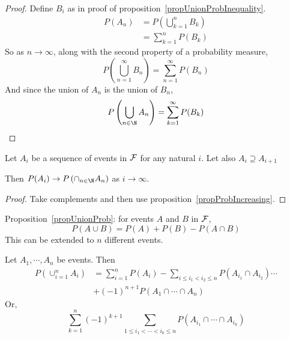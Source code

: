 \documentclass[../Main.tex]{subfiles}
\begin{document}
\begin{proof}
    Define $B_i$ as in proof of proposition~\ref{propUnionProbInequality}.
    \begin{align*}
        P(A_n) &= P\left(\bigcup_{k=1}^n B_k\right) \\
        &= \sum_{k=1}^{n} P(B_k)
    \end{align*}
    So as $n \to \infty$, along with the second property of a probability measure,
    \begin{equation*}
        P\left(\bigcup_{n=1}^\infty B_n \right) = \sum_{n=1}^{\infty} P(B_n)
    \end{equation*}
    And since the union of $A_n$ is the union of $B_n$,
    \begin{equation*}
        P\left(\bigcup_{n \in \N} A_n \right) = \sum_{k=1}^{\infty} P(B_k)
    \end{equation*}
\end{proof}
\begin{proposition}
    Let $A_i$ be a sequence of events in $\mathcal{F}$ for any natural $i$. Let also $A_i \supseteq A_{i+1}$\par
    Then $P(A_i) \to P\left(\cap_{n \in \N} A_n\right)$ as $i \to \infty$.
    \label{propProbDecreasing}
\end{proposition}
\begin{proof}
    Take complements and then use proposition~\ref{propProbIncreasing}.
\end{proof}
Proposition~\ref{propUnionProb}: for events $A$ and $B$ in $\mathcal{F}$,
\begin{equation*}
    P(A \cup B) = P(A) + P(B) - P(A \cap B)
\end{equation*}
This can be extended to $n$ different events.
\begin{theorem}
    Let $A_1, \cdots, A_n$ be events. Then
    \begin{align*}
        P\left(\cup_{i = 1}^n A_i\right) &= \sum_{i = 1}^n P(A_i) - \sum_{i \leq i_1 < i_2 \leq n} P(A_{i_1} \cap A_{i_2}) \cdots \\
        &+ (-1)^{n+1} P(A_1 \cap \cdots \cap A_n) 
    \end{align*}
    Or,
    \begin{equation}
        \sum_{k=1}^{n} (-1)^{k+1} \sum_{1 \leq i_1 < \cdots < i_k \leq n} P(A_{i_1} \cap \cdots \cap A_{i_k})
        \label{eqnInclusionExclusion}
    \end{equation}
    \label{thmInclusionExclusion}
\end{theorem}
\end{document}
